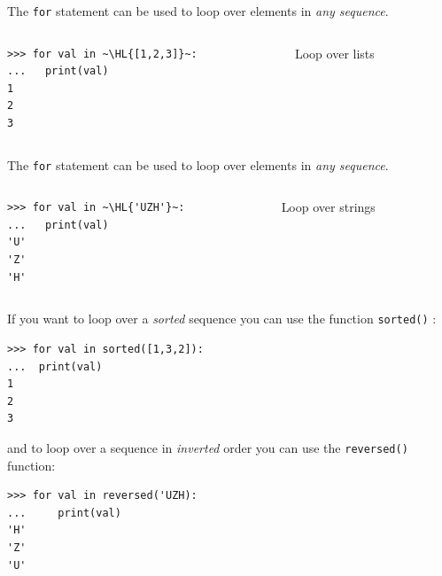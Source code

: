 \documentclass[english,serif,mathserif,xcolor=pdftex,dvipsnames,table]{beamer}
\begin{document}
\begin{frame}[fragile]
  The \texttt{for} statement can be used to loop over elements in \emph{any sequence}.

  \+
  \begin{columns}[c]
    \begin{column}{0.5\textwidth}
\begin{lstlisting}
>>> for val in ~\HL{[1,2,3]}~:
...   print(val)
1
2
3
\end{lstlisting}
    \end{column}
    \begin{column}{0.4\textwidth}
      \raggedleft
      Loop over lists
    \end{column}
  \end{columns}
\end{frame}


\begin{frame}[fragile]
  The \texttt{for} statement can be used to loop over elements in \emph{any sequence}.

  \+
  \begin{columns}[c]
    \begin{column}{0.5\textwidth}
\begin{lstlisting}
>>> for val in ~\HL{'UZH'}~:
...   print(val)
'U'
'Z'
'H'
\end{lstlisting}
    \end{column}
    \begin{column}{0.4\textwidth}
      \raggedleft
      Loop over strings
    \end{column}
  \end{columns}
\end{frame}

\begin{frame}[fragile]

  If you want to loop over a \textit{sorted} sequence you can use the
  function \texttt{sorted()} :

  \begin{lstlisting}
>>> for val in sorted([1,3,2]):
...  print(val)
1
2
3
  \end{lstlisting}

and to loop over a sequence in \textit{inverted} order you can use the
\texttt{reversed()} function:

\begin{lstlisting}
>>> for val in reversed('UZH):
...     print(val)
'H'
'Z'
'U'
\end{lstlisting}

\end{frame}
\end{document}
